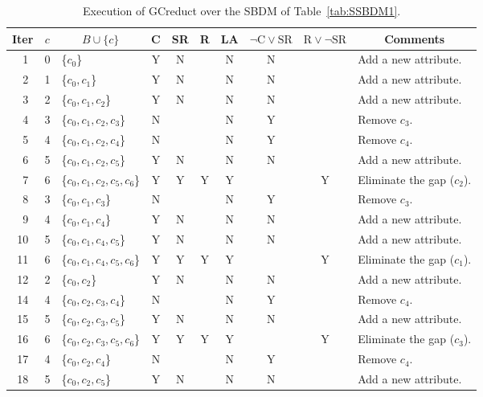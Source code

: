 \documentclass[number,preprint,review,12pt]{elsarticle}
\begin{document}
	\begin{table}[!htb]
		\caption{Execution of GCreduct over the SBDM of Table~\ref{tab:SSBDM1}.}\label{tab:sample_GCreduct}
      	\centering \scriptsize
    		\begin{tabular}{|c|c|l|c|c|c|c|c|c|l|}
    		\hline
    		Iter & $c$ & \multicolumn{1}{c|}{$B\cup \lbrace c\rbrace$} & C & SR & R & LA & $\neg \mathrm{C} \vee \mathrm{SR}$ & $\mathrm{R} \vee \neg \mathrm{SR}$ & \multicolumn{1}{c|}{Comments}\\
    		\hline
    		~1 & 0 & \{$c_0$\} 			        & Y & N &   & N & N &   & Add a new attribute.\\
    		~2 & 1 & \{$c_0,c_1$\}				& Y & N &   & N & N &   & Add a new attribute.\\
    		~3 & 2 & \{$c_0,c_1,c_2$\}			& Y & N &   & N & N &   & Add a new attribute.\\
    		~4 & 3 & \{$c_0,c_1,c_2,c_3$\}		& N &   &   & N & Y &   & Remove $c_3$.\\
    		~5 & 4 & \{$c_0,c_1,c_2,c_4$\}		& N &   &   & N & Y &   & Remove $c_4$.\\
    		~6 & 5 & \{$c_0,c_1,c_2,c_5$\}		& Y & N &   & N & N &   & Add a new attribute.\\
    		~7 & 6 & \{$c_0,c_1,c_2,c_5,c_6$\} 	& Y & Y & Y & Y &   & Y & Eliminate the gap ($c_2$).\\
    		~8 & 3 & \{$c_0,c_1,c_3$\}			& N &   &   & N & Y &   & Remove $c_3$.\\
    		~9 & 4 & \{$c_0,c_1,c_4$\}			& Y & N &   & N & N &   & Add a new attribute.\\
    		10 & 5 & \{$c_0,c_1,c_4,c_5$\}		& Y & N &   & N & N &   & Add a new attribute.\\
    		11 & 6 & \{$c_0,c_1,c_4,c_5,c_6$\} 	& Y & Y & Y & Y &   & Y & Eliminate the gap ($c_1$).\\
    		12 & 2 & \{$c_0,c_2$\}				& Y & N &   & N & N &   & Add a new attribute.\\
    		14 & 4 & \{$c_0,c_2,c_3,c_4$\}		& N &   &   & N & Y &   & Remove $c_4$.\\
    		15 & 5 & \{$c_0,c_2,c_3,c_5$\}		& Y & N &   & N & N &   & Add a new attribute.\\
    		16 & 6 & \{$c_0,c_2,c_3,c_5,c_6$\} 	& Y & Y & Y & Y &   & Y & Eliminate the gap ($c_3$).\\
    		17 & 4 & \{$c_0,c_2,c_4$\}			& N &   &   & N & Y &   & Remove $c_4$.\\
    		18 & 5 & \{$c_0,c_2,c_5$\}			& Y & N &   & N & N &   & Add a new attribute.\\

\end{tabular}
\end{table}
\end{document}
